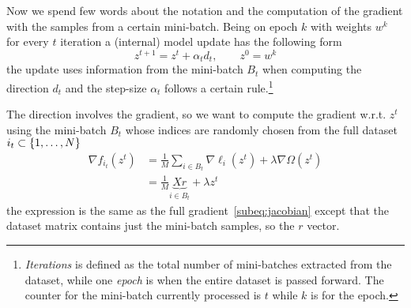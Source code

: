 Now we spend few words about the notation and the computation of the gradient with the samples from a certain mini-batch. Being on epoch $k$ with weights $w^k$ for every $t$ iteration a (internal) model update has the following form
\begin{equation}\label{eq:sgd-step}
z^{t+1}=z^t+\alpha_td_t,\qquad z^0=w^k
\end{equation}
the update uses information from the mini-batch $B_t$ when computing the direction $d_t$ and the step-size $\alpha_t$ follows a certain rule.\footnote{\emph{Iterations} is defined as the total number of mini-batches extracted from the dataset, while one \emph{epoch} is when the entire dataset is passed forward. The counter for the mini-batch currently processed is $t$ while $k$ is for the epoch.}


The direction involves the gradient, so we want to compute the gradient w.r.t. $z^t$ using the mini-batch $B_t$ whose indices are randomly chosen from the full dataset $i_t\subset\{1,\dots,N\}$%
\begin{equation}\label{eq:mini-grad}
\begin{split}
\nabla f_{i_t}(z^t) &= \frac{1}{M}\sum_{i\in B_t}\nabla \ell_i(z^t)+\lambda\nabla\Omega(z^t) \\
 &= \frac{1}{M}\underbrace{Xr}_{i\in B_t}+\lambda z^t
\end{split}
\end{equation}
the expression is the same as the full gradient~\eqref{subeq:jacobian} except that the dataset matrix contains just the mini-batch samples, so the $r$ vector.

